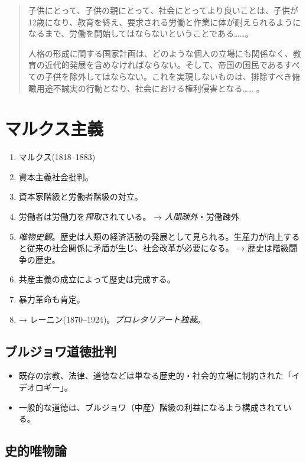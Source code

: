 \documentclass[uplatex,dvipdfmx]{jsarticle} \usepackage{mystyle}%
\begin{document}
\begin{quotation}
子供にとって、子供の親にとって、社会にとってより良いことは、子供が12歳になり、教育を終え、要求される労働と作業に体が耐えられるようになるまで、労働を開始してはならないということである……。

人格の形成に関する国家計画は、どのような個人の立場にも関係なく、教育の近代的発展を含めなければならない。そして、帝国の国民であるすべての子供を除外してはならない。これを実現しないものは、排除すべき俯瞰用途不誠実の行動となり、社会における権利侵害となる……
。
\end{quotation}



\section{マルクス主義}

\begin{enumerate}

\item マルクス(1818--1883)
\item 資本主義社会批判。
\item 資本家階級と労働者階級の対立。
\item 労働者は労働力を\emph{搾取}されている。 → \emph{人間疎外}・労働疎外
\item \emph{唯物史観}。歴史は人類の経済活動の発展として見られる。生産力が向上すると従来の社会関係に矛盾が生じ、社会改革が必要になる。 → 歴史は階級闘争の歴史。
\item 共産主義の成立によって歴史は完成する。
\item 暴力革命も肯定。
\item → レーニン(1870--1924)。\emph{プロレタリアート独裁}。
\end{enumerate}

\subsection{ブルジョワ道徳批判}

\begin{itemize}
\item 既存の宗教、法律、道徳などは単なる歴史的・社会的立場に制約された「イデオロギー」。
\item 一般的な道徳は、ブルジョワ（中産）階級の利益になるよう構成されている。
\end{itemize}


\subsection{史的唯物論}
\end{document}
